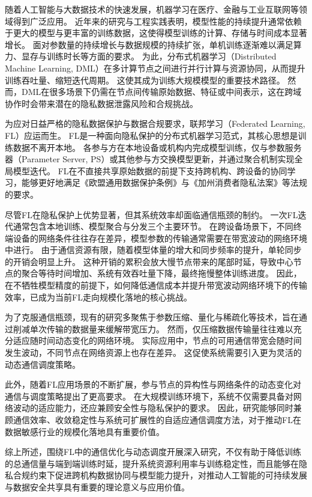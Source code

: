 \documentclass[master, vlined]{DissertUESTC}
\begin{document}
	随着人工智能与大数据技术的快速发展，机器学习在医疗、金融与工业互联网等领域得到广泛应用。
	近年来的研究与工程实践表明，模型性能的持续提升通常依赖于更大的模型与更丰富的训练数据，这使得模型训练的计算、存储与时间成本显著增长。
	面对参数量的持续增长与数据规模的持续扩张，单机训练逐渐难以满足算力、显存与训练时长等方面的要求。
	为此，分布式机器学习（Distributed Machine Learning, DML）在多计算节点之间进行并行计算与资源协同，从而提升训练吞吐量、缩短迭代周期。
	这使其成为训练大规模模型的重要技术路径。
	然而，DML在很多场景下仍需在节点间传输原始数据、特征或中间表示，这在跨域协作时会带来潜在的隐私数据泄露风险和合规挑战。

	为应对日益严格的隐私数据保护与数据合规要求，联邦学习（Federated Learning, FL）应运而生。
	FL是一种面向隐私保护的分布式机器学习范式，其核心思想是训练数据不离开本地。
	各参与方在本地设备或机构内完成模型训练，仅与参数服务器（Parameter Server, PS）或其他参与方交换模型更新，并通过聚合机制实现全局模型迭代。
	FL在不直接共享原始数据的前提下支持跨机构、跨设备的协同学习，能够更好地满足《欧盟通用数据保护条例》与《加州消费者隐私法案》等法规的要求。

	尽管FL在隐私保护上优势显著，但其系统效率却面临通信瓶颈的制约。
	一次FL迭代通常包含本地训练、模型聚合与分发三个主要环节。
	在跨设备场景下，不同终端设备的网络条件往往存在差异，模型参数的传输通常需要在带宽波动的网络环境中进行。
	由于通信资源有限，随着模型体量的增大和同步频率的提升，单轮同步的开销会明显上升。
	这种开销的累积会放大慢节点带来的尾部时延，导致中心节点的聚合等待时间增加、系统有效吞吐量下降，最终拖慢整体训练进度。
	因此，在不牺牲模型精度的前提下，如何降低通信成本并提升带宽波动网络环境下的传输效率，已成为当前FL走向规模化落地的核心挑战。

	为了克服通信瓶颈，现有的研究多聚焦于参数压缩、量化与稀疏化等技术，旨在通过削减单次传输的数据量来缓解带宽压力。
	然而，仅压缩数据传输量往往难以充分适应随时间动态变化的网络环境。
	实际应用中，节点的可用通信带宽会随时间发生波动，不同节点在网络资源上也存在差异。
	这促使系统需要引入更为灵活的动态通信调度策略。

	此外，随着FL应用场景的不断扩展，参与节点的异构性与网络条件的动态变化对通信与调度策略提出了更高要求。
	在大规模训练环境下，系统不仅需要具备对网络波动的适应能力，还应兼顾安全性与隐私保护的要求。
	因此，研究能够同时兼顾通信效率、收敛稳定性与系统可扩展性的自适应通信调度方法，对于推动FL在数据敏感行业的规模化落地具有重要价值。

	综上所述，围绕FL中的通信优化与动态调度开展深入研究，不仅有助于降低训练的总通信量与端到端训练时延，提升系统资源利用率与训练稳定性，而且能够在隐私合规约束下促进跨机构数据协同与模型能力提升，对推动人工智能的可持续发展与数据安全共享具有重要的理论意义与应用价值。
\end{document}
